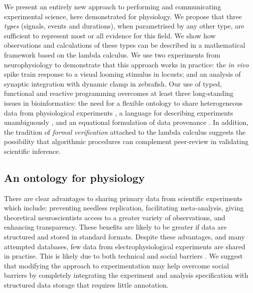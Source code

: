 \documentclass[11pt]{article}
\begin{document}
We present an entirely new approach to performing and communicating
experimental science, here demonstrated for physiology. We propose
that three \emph{types} (signals, events and durations), when
parametrised by any other type, are sufficient to represent most or
all evidence for this field. We show how observations and calculations
of these types can be described in a mathematical framework based on
the lambda calculus. We use two experiments from neurophysiology to
demonstrate that this approach works in practice: the \emph{in vivo}
spike train response to a visual looming stimulus in locusts; and an
analysis of synaptic integration with dynamic clamp in zebrafish. Our use
of typed, functional and reactive programming overcomes at least three
long-standing issues in bioinformatics: the need for a flexible
ontology to share heterogeneous data from physiological experiments
\cite{Amari2002}, a language for describing experiments unambiguously
\cite{Murray-Rust2002}, and an equational formulation of data
provenance \cite{Pool2002}. In addition, the tradition of
\emph{formal verification} attached to the lambda calculus
\cite{Harrison2009,DeBruijn1968,Bird1996,Hindley2008}
suggests the possibility that algorithmic procedures can complement
peer-review in validating scientific inference.

\subsection*{An ontology for physiology}

There are clear advantages to sharing primary data from scientific
experiments \cite{Insel2003} which include: preventing needless replication,
facilitating meta-analysis, giving theoretical neuroscientists access
to a greater variety of observations, and enhancing transparency. These
benefits are likely to be greater if data are structured and stored in
standard formats. Despite these advantages, and many attempted
databases, few data from electrophysiological experiments are
shared in practise. This is likely due to both technical and social
barriers \cite{Amari2002}. We suggest that modifying the approach to
experimentation may help overcome social barriers by completely
integrating the experiment and analysis specification with structured
data storage that requires little annotation.
\end{document}
